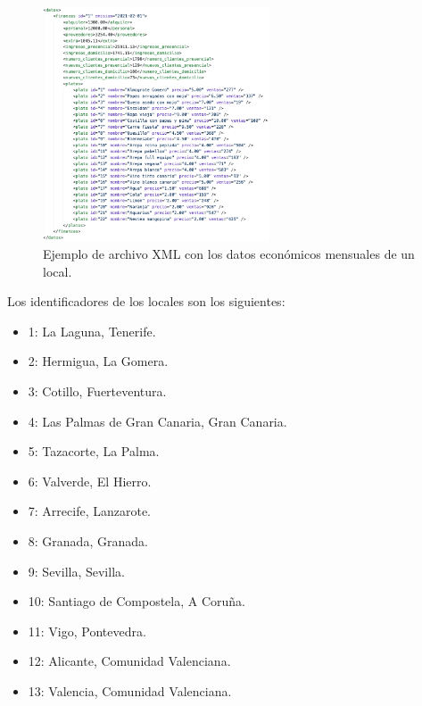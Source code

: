 \documentclass[12pt]{opticajnl}
\begin{document}
\begin{figure}[h]
\centering
\includegraphics[width=0.6\textwidth]{fotos/1.png}
\caption{Ejemplo de archivo XML con los datos económicos mensuales de un local.}
\label{fig:xml_economico}
\end{figure}

\noindent Los identificadores de los locales son los siguientes:
\begin{multicols}{2}
\begin{itemize}
\item 1: La Laguna, Tenerife.
\item 2: Hermigua, La Gomera.
\item 3: Cotillo, Fuerteventura.
\item 4: Las Palmas de Gran Canaria, Gran Canaria.
\item 5: Tazacorte, La Palma.
\item 6: Valverde, El Hierro.
\item 7: Arrecife, Lanzarote.
\item 8: Granada, Granada.
\item 9: Sevilla, Sevilla.
\item 10: Santiago de Compostela, A Coruña.
\item 11: Vigo, Pontevedra.
\item 12: Alicante, Comunidad Valenciana.
\item 13: Valencia, Comunidad Valenciana. 
\end{itemize}
\end{multicols}
\end{document}
